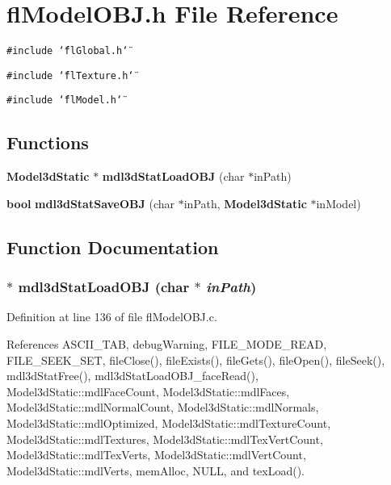 \section{fl\-Model\-OBJ.h File Reference}
\label{flModelOBJ_8h}
{\tt \#include \char`\"{}fl\-Global.h\char`\"{}}\par
{\tt \#include \char`\"{}fl\-Texture.h\char`\"{}}\par
{\tt \#include \char`\"{}fl\-Model.h\char`\"{}}\par
\subsection*{Functions}
\begin{CompactItemize}
\item 
{\bf Model3d\-Static} $\ast$ {\bf mdl3d\-Stat\-Load\-OBJ} (char $\ast$in\-Path)
\item 
{\bf bool} {\bf mdl3d\-Stat\-Save\-OBJ} (char $\ast$in\-Path, {\bf Model3d\-Static} $\ast$in\-Model)
\end{CompactItemize}


\subsection{Function Documentation}
\subsubsection{$\ast$ mdl3d\-Stat\-Load\-OBJ (char $\ast$ {\em in\-Path})}\label{flModelOBJ_8h_da03a66f7027e134ce6d14f0f73149d5}




Definition at line 136 of file fl\-Model\-OBJ.c.

References ASCII\_\-TAB, debug\-Warning, FILE\_\-MODE\_\-READ, FILE\_\-SEEK\_\-SET, file\-Close(), file\-Exists(), file\-Gets(), file\-Open(), file\-Seek(), mdl3d\-Stat\-Free(), mdl3d\-Stat\-Load\-OBJ\_\-face\-Read(), Model3d\-Static::mdl\-Face\-Count, Model3d\-Static::mdl\-Faces, Model3d\-Static::mdl\-Normal\-Count, Model3d\-Static::mdl\-Normals, Model3d\-Static::mdl\-Optimized, Model3d\-Static::mdl\-Texture\-Count, Model3d\-Static::mdl\-Textures, Model3d\-Static::mdl\-Tex\-Vert\-Count, Model3d\-Static::mdl\-Tex\-Verts, Model3d\-Static::mdl\-Vert\-Count, Model3d\-Static::mdl\-Verts, mem\-Alloc, NULL, and tex\-Load().

